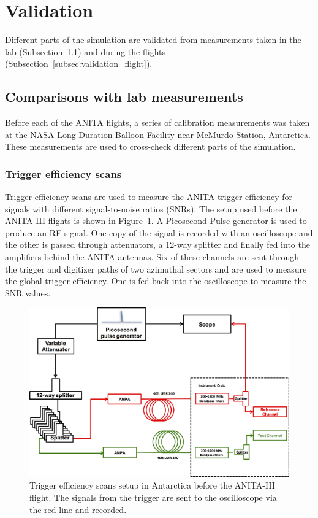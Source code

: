 \section{Validation}
\label{sec:validation}
Different parts of the simulation are validated from measurements
taken in the lab (Subsection~\ref{subsec:validation_lab}) and during
the flights (Subsection~\ref{subsec:validation_flight}).


\subsection{Comparisons with lab measurements}
\label{subsec:validation_lab}
Before each of the ANITA flights, a series of calibration measurements was
taken at the NASA Long Duration Balloon Facility near McMurdo Station, Antarctica.
These measurements are used to cross-check different parts of the simulation.

\subsubsection{Trigger efficiency scans}
\label{subsec:validation_scans}
Trigger efficiency scans are used to measure the ANITA trigger efficiency
for signals with different signal-to-noise ratios (SNRs).
The setup used before the ANITA-III flights is shown in Figure~\ref{fig:scan_setup}. 
A Picosecond Pulse generator is used to produce an RF signal. 
One copy of the signal is recorded with an oscilloscope and the other
is passed through attenuators, a 12-way splitter and finally
fed into the amplifiers behind the ANITA antennas.
Six of these channels are sent through the trigger and digitizer paths of
two azimuthal sectors and
are used to measure the global trigger efficiency. 
One is fed back into the oscilloscope to measure the SNR values.

\begin{figure}[!h]\centering
  \includegraphics[width=.8\linewidth]{./Figs/TriggerEfficiencyScanSetup.png}
  \caption{Trigger efficiency scans setup in Antarctica before the ANITA-III flight. The signals from the trigger are sent to the oscilloscope via the red line and recorded.}
  \label{fig:scan_setup}
\end{figure}

